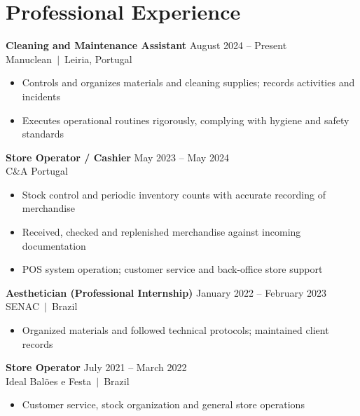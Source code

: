 \documentclass[10pt,a4paper]{article}
\begin{document}
\section{Professional Experience}

{\small\bfseries Cleaning and Maintenance Assistant}\hfill{\small\color{subtle} August 2024 -- Present}\\
{\small\color{accent} Manuclean~$|$~Leiria, Portugal}
\begin{itemize}\small
  \item Controls and organizes materials and cleaning supplies; records activities and incidents
  \item Executes operational routines rigorously, complying with hygiene and safety standards
\end{itemize}

\vspace{3pt}
{\small\bfseries Store Operator / Cashier}\hfill{\small\color{subtle} May 2023 -- May 2024}\\
{\small\color{accent} C\&A Portugal}
\begin{itemize}\small
  \item Stock control and periodic inventory counts with accurate recording of merchandise
  \item Received, checked and replenished merchandise against incoming documentation
  \item POS system operation; customer service and back-office store support
\end{itemize}

\vspace{3pt}
{\small\bfseries Aesthetician (Professional Internship)}\hfill{\small\color{subtle} January 2022 -- February 2023}\\
{\small\color{accent} SENAC~$|$~Brazil}
\begin{itemize}\small
  \item Organized materials and followed technical protocols; maintained client records
\end{itemize}

\vspace{3pt}
{\small\bfseries Store Operator}\hfill{\small\color{subtle} July 2021 -- March 2022}\\
{\small\color{accent} Ideal Balões e Festa~$|$~Brazil}
\begin{itemize}\small
  \item Customer service, stock organization and general store operations
\end{itemize}
\end{document}
